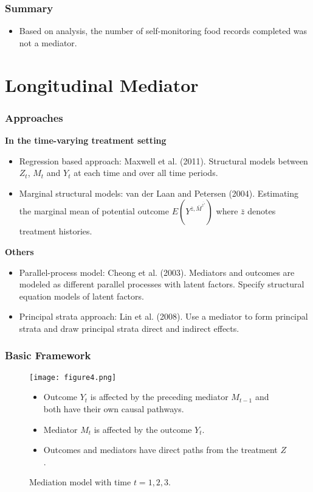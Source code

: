\documentclass{beamer}
\begin{document}
\begin{frame}
\frametitle{Summary}
\begin{itemize}
\item Based on analysis, the number of self-monitoring food records
  completed was not a mediator.
\end{itemize}
\end{frame}


\section{Longitudinal Mediator}

\begin{frame}

 

\end{frame}

\begin{frame}
\frametitle{Approaches}
{\bf In the time-varying treatment setting}
\begin{itemize}
\item {\color{red} Regression based approach}:  Maxwell et al. (2011). Structural models between $Z_t$, $M_t$ and $Y_t$ at each time and over all time periods.
\item {\color{red} Marginal structural models}: van der Laan and Petersen (2004). Estimating the marginal mean of potential outcome $E(Y^{\bar{z},\bar{M}^{\bar{z'}}})$
where $\bar{z}$ denotes treatment histories.
\end{itemize}
{\bf Others}
\begin{itemize}
\item {\color{red} Parallel-process model}: Cheong et al. (2003). Mediators and outcomes are modeled as different parallel processes with latent factors. Specify structural equation models of latent factors.
\item {\color{red} Principal strata approach}: Lin et al. (2008). Use a mediator to form principal strata and draw principal strata direct and indirect effects. 
\end{itemize}
\end{frame}


\begin{frame}
\frametitle{Basic Framework}
\begin{figure}[h]
\centering
\scalebox{0.26}
{\texttt{[image: figure4.png]}}
\caption{Mediation model with time $t=1,2,3$.}
\begin{itemize}
\item Outcome $Y_t$ is affected by the preceding mediator $M_{t-1}$ and both have their own causal pathways.
\item Mediator $M_t$ is affected by the outcome $Y_t$.
\item Outcomes and mediators have direct paths from the treatment $Z$.
\end{itemize}
\end{figure}
\end{frame}
\end{document}
